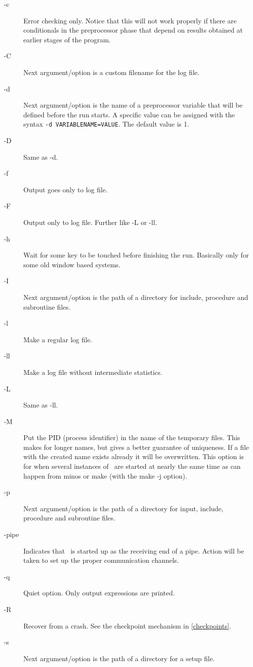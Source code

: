 \begin{description}
\item[-c] Error checking only. Notice that this will not work 
     properly if there are conditionals in the preprocessor phase that 
     depend on results obtained at earlier stages of the program.
\item[-C] Next argument/option is a custom filename for the log file.
\item[-d] Next argument/option is the name of a preprocessor 
     variable that will be defined before the run starts. A specific value can be assigned with the
	 syntax {\tt -d VARIABLENAME=VALUE}. The default value is 1.
\item[-D] Same as -d.
\item[-f] Output goes only to log file.
\item[-F] Output only to log file. Further like -L or -ll.
\item[-h] Wait for some key to be touched before finishing the run.
     Basically only for some old window based systems.
\item[-I] Next argument/option is the path of a directory for 
     include, procedure and subroutine files.
\item[-l] Make a regular log file.
\item[-ll] Make a log file without intermediate statistics.
\item[-L] Same as -ll.
\item[-M] Put the PID (process identifier) in the name of the temporary 
     files. This makes for longer names, but gives a better guarantee of 
     uniqueness. If a file with the created name exists already it will be 
     overwritten. This option is for when several instances of \FORM\ are 
     started at nearly the same time as can happen from minos or make (with 
     the make -j option).
\item[-p] Next argument/option is the path of a directory for 
     input, include, procedure and subroutine files.
\item[-{pipe}] Indicates that \FORM\ is started up as the receiving 
     end of a pipe. Action will be taken to set up the proper communication 
     channels.
\item[-q] Quiet option. Only output expressions are printed.
\item[-R] Recover from a crash. See the checkpoint mechanism in 
     \ref{checkpoints}.
\item[-s] Next argument/option is the path of a directory for a 
     setup file.

\end{description}
